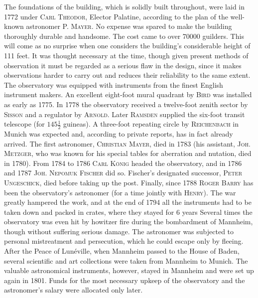 The foundations of the building, which is solidly built throughout, were laid in 1772 under \textsc{Carl Theodor}, Elector Palatine, according to the plan of the well-known astronomer P. \textsc{Mayer}. No expense was spared to make the building thoroughly durable and handsome. The cost came to over 70000 guilders. This will come as no surprise when one considers the building's considerable height of 111 feet. It was thought necessary at the time, though given present methods of observation it must be regarded as a serious flaw in the design, since it makes observations harder to carry out and reduces their reliability to the same extent. The observatory was equipped with instruments from the finest English instrument makers. An excellent eight-foot mural quadrant by \textsc{Bird} was installed as early as 1775. In 1778 the observatory received a twelve-foot zenith sector by \textsc{Sisson} and a regulator by \textsc{Arnold}. Later \textsc{Ramsden} supplied the six-foot transit telescope (for $145\tfrac{1}{2}$ guineas). A three-foot repeating circle by \textsc{Reichenbach} in Munich was expected and, according to private reports, has in fact already arrived. The first astronomer, \textsc{Christian Mayer}, died in 1783 (his assistant, \textsc{Joh. Metzger}, who was known for his special tables for aberration and nutation, died in 1780). From 1784 to 1786 \textsc{Carl König} headed the observatory, and in 1786 and 1787 \textsc{Joh. Nepomuk Fischer} did so. Fischer's designated successor, \textsc{Peter Ungeschick}, died before taking up the post. Finally, since 1788 \textsc{Roger Barry} has been the observatory's astronomer (for a time jointly with \textsc{Henry}). The war greatly hampered the work, and at the end of 1794 all the instruments had to be taken down and packed in crates, where they stayed for 6 years Several times the observatory was even hit by howitzer fire during the bombardment of Mannheim, though without suffering serious damage. The astronomer was subjected to personal mistreatment and persecution, which he could escape only by fleeing. After the Peace of Lunéville, when Mannheim passed to the House of Baden, several scientific and art collections were taken from Mannheim to Munich. The valuable astronomical instruments, however, stayed in Mannheim and were set up again in 1801. Funds for the most necessary upkeep of the observatory and the astronomer's salary were allocated only later.

